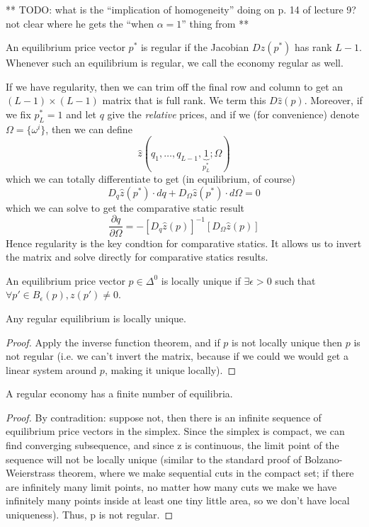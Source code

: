 ** TODO: what is the ``implication of homogeneity'' doing on p. 14 of
lecture 9? not clear where he gets the ``when $\alpha = 1$'' thing
from **


\begin{definition}
  An equilibrium price vector $p^*$ is regular if the Jacobian
  $Dz(p^*)$ has rank $L-1$. Whenever such an equilibrium is regular,
  we call the economy regular as well.
\end{definition}

If we have regularity, then we can trim off the final row and column
to get an $(L-1)\times(L-1)$ matrix that is full rank. We term this
$D\hat z(p)$. Moreover, if we fix $p^*_L = 1$ and let $q$ give the
\textit{relative} prices, and if we (for convenience) denote $\Omega =
\{\omega^i\}$, then we can define
\[
\hat z(q_1, \dots, q_{L-1}, \underbrace{1}_{p^*_L}; \Omega)
\]
which we can totally differentiate to get (in equilibrium, of course)
\[
D_q \hat z(p^*) \cdot dq + D_\Omega \hat z(p^*) \cdot d\Omega = 0
\]
which we can solve to get the comparative static result
\[
\frac{\partial q}{\partial \Omega} = - [D_q \hat z(p)]^{-1} [D_\Omega \hat z(p)]
\]
Hence regularity is the key condtion for comparative statics. It
allows us to invert the matrix and solve directly for comparative
statics results.

\begin{definition}
  An equilibrium price vector $p \in \Delta^0$ is locally unique if
  $\exists \epsilon > 0$ such that $\forall p' \in B_\epsilon(p),
  z(p') \neq 0$.
\end{definition}

\begin{theorem}
  Any regular equilibrium is locally unique.
\end{theorem}

\begin{proof}
  Apply the inverse function theorem, and if $p$ is not locally unique
  then $p$ is not regular (i.e. we can't invert the matrix, because if
  we could we would get a linear system around $p$, making it unique
  locally).
\end{proof}

\begin{theorem}
  A regular economy has a finite number of equilibria.
\end{theorem}

\begin{proof}
  By contradition: suppose not, then there is an infinite sequence of
  equilibrium price vectors in the simplex. Since the simplex is
  compact, we can find converging subsequence, and since z is
  continuous, the limit point of the sequence will not be locally
  unique (similar to the standard proof of Bolzano-Weierstrass
  theorem, where we make sequential cuts in the compact set; if there
  are infinitely many limit points, no matter how many cuts we make we
  have infinitely many points inside at least one tiny little area, so
  we don't have local uniqueness). Thus, p is not regular.
\end{proof}

